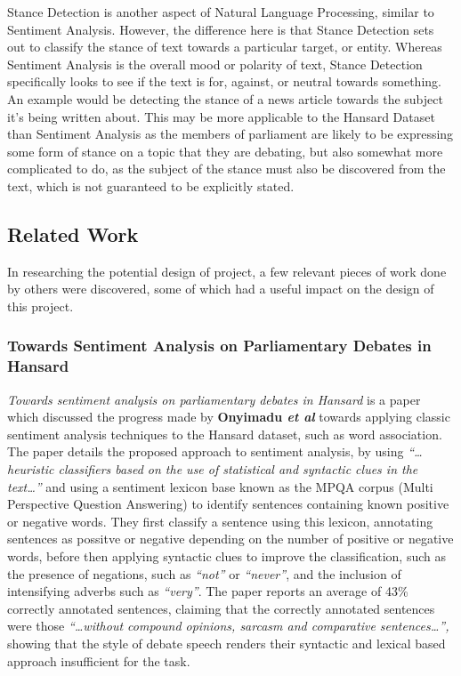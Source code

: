Stance Detection is another aspect of Natural Language Processing, similar to Sentiment Analysis. However, the difference here is that Stance Detection sets out to classify the stance of text towards a particular target, or entity. Whereas Sentiment Analysis is the overall mood or polarity of text, Stance Detection specifically looks to see if the text is for, against, or neutral towards something\cite{Augenstein2016}. An example would be detecting the stance of a news article towards the subject it's being written about. This may be more applicable to the Hansard Dataset than Sentiment Analysis as the members of parliament are likely to be expressing some form of stance on a topic that they are debating, but also somewhat more complicated to do, as the subject of the stance must also be discovered from the text, which is not guaranteed to be explicitly stated.

\subsection{Related Work}
\label{sec:bck_related}

In researching the potential design of project, a few relevant pieces of work done by others were discovered, some of which had a useful impact on the design of this project. 

\subsubsection{Towards Sentiment Analysis on Parliamentary Debates in Hansard}
\emph{Towards sentiment analysis on parliamentary debates in Hansard}\cite{Onyimadu2014} is a paper which discussed the progress made by \textbf{Onyimadu \emph{et al}} towards applying classic sentiment analysis techniques to the Hansard dataset, such as word association. The paper details the proposed approach to sentiment analysis, by using \emph{“…heuristic classifiers based on the use of statistical and syntactic clues in the text…”} and using a sentiment lexicon base known as the MPQA corpus (Multi Perspective Question Answering) to identify sentences containing known positive or negative words. They first classify a sentence using this lexicon, annotating sentences as possitve or negative depending on the number of positive or negative words, before then applying syntactic clues to improve the classification, such as the presence of negations, such as \emph{“not”} or \emph{“never”}, and the inclusion of intensifying adverbs such as \emph{“very”}. The paper reports an average of 43\% correctly annotated sentences, claiming that the correctly annotated sentences were those \emph{“…without compound opinions, sarcasm and comparative sentences…”,} showing that the style of debate speech renders their syntactic and lexical based approach insufficient for the task.

